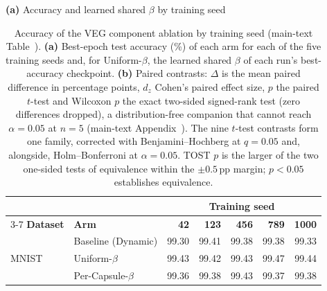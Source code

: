 
\begin{table}[!htbp]
    \centering
    \caption{Accuracy of the VEG component ablation by training seed (main-text Table~\MainTabAccuracy). \textbf{(a)} Best-epoch test accuracy (\%) of each arm for each of the five training seeds and, for Uniform-$\beta$, the learned shared $\beta$ of each run's best-accuracy checkpoint. \textbf{(b)} Paired contrasts: $\Delta$ is the mean paired difference in percentage points, $d_z$ Cohen's paired effect size, $p$ the paired $t$-test and Wilcoxon $p$ the exact two-sided signed-rank test (zero differences dropped), a distribution-free companion that cannot reach $\alpha = 0.05$ at $n = 5$ (main-text Appendix~\MainAppStatistics). The nine $t$-test contrasts form one family, corrected with Benjamini--Hochberg at $q = 0.05$ and, alongside, Holm--Bonferroni at $\alpha = 0.05$. TOST $p$ is the larger of the two one-sided tests of equivalence within the $\pm 0.5$\,pp margin; $p < 0.05$ establishes equivalence.}
    \label{tabS:accuracy_contrasts}
    \scriptsize
    \setlength{\tabcolsep}{4pt}
    \textbf{(a)} Accuracy and learned shared $\beta$ by training seed\\[2pt]
    \begin{tabular}{@{}llrrrrr@{}}
        \toprule
        & & \multicolumn{5}{c}{\textbf{Training seed}} \\
        \cmidrule(l){3-7}
        \textbf{Dataset} & \textbf{Arm} & \textbf{42} & \textbf{123} & \textbf{456} & \textbf{789} & \textbf{1000} \\
        \midrule
        \multirow{4}{*}{MNIST} & Baseline (Dynamic) & 99.30 & 99.41 & 99.38 & 99.38 & 99.33 \\
         & Uniform-$\beta$ & 99.43 & 99.42 & 99.43 & 99.47 & 99.44 \\
         & Per-Capsule-$\beta$ & 99.36 & 99.38 & 99.43 & 99.37 & 99.38 \\

\end{tabular}
\end{table}
